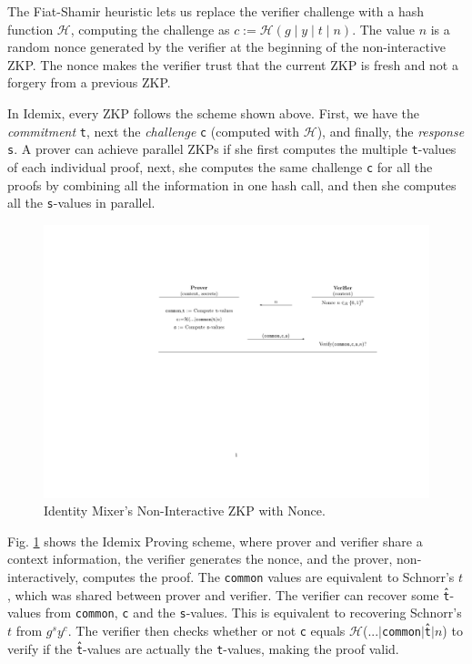 The Fiat-Shamir heuristic lets us replace the verifier challenge with a hash function $\mathcal{H}$, computing the challenge as $c:=\mathcal{H}(g\mid y\mid t\mid n)$. The value $n$ is a random nonce generated by the verifier at the beginning of the non-interactive ZKP. The nonce makes the verifier trust that the current ZKP is fresh and not a forgery from a previous ZKP.

In Idemix, every ZKP follows the scheme shown above. First, we have the \textit{commitment} \texttt{t}, next the \textit{challenge} \texttt{c} (computed with $\mathcal{H}$), and finally, the \textit{response} \texttt{s}. A prover can achieve parallel ZKPs if she first computes the multiple \texttt{t}-values of each individual proof, next, she computes the same challenge \texttt{c} for all the proofs by combining all the information in one hash call, and then she computes all the \texttt{s}-values in parallel.

\begin{figure}[bth]
	\includegraphics[width=\linewidth]{gfx/niZKPnonce}
		\caption{Identity Mixer's Non-Interactive ZKP with Nonce.}
	\label{fig:niZKPnonce}
\end{figure}

Fig. \ref{fig:niZKPnonce} shows the Idemix Proving scheme, where prover and verifier share a context information, the verifier generates the nonce, and the prover, non-interactively, computes the proof. The \texttt{common} values are equivalent to Schnorr's $t$, which was shared between prover and verifier. The verifier can recover some \texttt{\^t}-values from \texttt{common}, \texttt{c} and the \texttt{s}-values. This is equivalent to recovering Schnorr's $t$ from $g^{s} y^c$. The verifier then checks whether or not \texttt{c} equals $\mathcal{H}$(...$\mid$\texttt{common}$\mid$\texttt{\^t}$\mid$$n$) to verify if the \texttt{\^t}-values are actually the \texttt{t}-values, making the proof valid.


